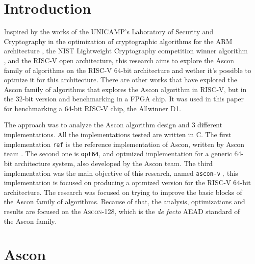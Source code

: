 \documentclass[11pt,twoside]{article}
\begin{document}
\section{Introduction}
Inspired by the works of the UNICAMP's Laboratory of Security and Cryptography in the optimization of cryptographic algorithms for the ARM architecture \cite{Fujii2017a}, the NIST Lightweight Cryptography competition winner algorithm \cite{turan2023status}, and the RISC-V open architecture, this research aims to explore the Ascon family of algorithms \cite{asconv12nist} on the RISC-V 64-bit architecture and wether it's possible to optmize it for this architecture. There are other works that have explored the Ascon family of algorithms \cite{jellema2019optimizing} that explores the Ascon algorithm in RISC-V, but in the 32-bit version and benchmarking in a FPGA chip. It was used in this paper for benchmarking a 64-bit RISC-V chip, the Allwinner D1.

The approach was to analyze the Ascon algorithm design and 3 different implementations. All the implementations tested are written in C. The first implementation \texttt{ref} is the reference implementation of Ascon, written by Ascon team \cite{asconc2023}. The second one is \texttt{opt64}, and optmized implementation for a generic 64-bit architecture system, also developed by the Ascon team. The  third implementation was the main objective of this research, named \texttt{ascon-v} \cite{asconv2023}, this implementation is focused on producing a optmized version for the RISC-V 64-bit architecture. The research was focused on trying to improve the basic blocks of the Ascon family of algorithms. Because of that, the analysis, optimizations and results are focused on the \textsc{Ascon-128}, which is the \textit{de facto} AEAD standard of the Ascon family.

\section{Ascon}
\end{document}
